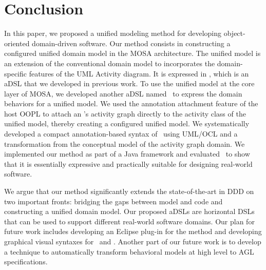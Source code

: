 %
\section{Conclusion}\label{sect:conclusion} %
In this paper, we proposed a unified modeling method for developing object-oriented domain-driven software. Our method consists in constructing a configured unified domain model in the MOSA architecture. The unified model is an extension of the conventional domain model to incorporates the domain-specific features of the UML Activity diagram. It is expressed in \dcsl, which is an aDSL that we developed in previous work. To use the unified model at the core layer of MOSA, we developed another aDSL named \agl~to express the domain behaviors for a unified model. We used the annotation attachment feature of the host OOPL to attach an \agl's activity graph directly to the activity class of the unified model, thereby creating a configured unified model.
We systematically developed a compact annotation-based syntax of \agl~using UML/OCL and a transformation from the conceptual model of the activity graph domain.
%
We implemented our method as part of a Java framework and evaluated \agl~to show that it is essentially expressive and practically suitable for designing real-world software. 

We argue that our method significantly extends the state-of-the-art in DDD on two important fronts: bridging the gaps between model and code and constructing a unified domain model. Our proposed aDSLs are horizontal DSLs that can be used to support different real-world software domains.
%
Our plan for future work includes
developing an Eclipse plug-in for the method and developing graphical visual syntaxes for \dcsl~and \agl. Another part of our future work is to develop a technique to automatically transform behavioral models at high level to AGL specifications. 
